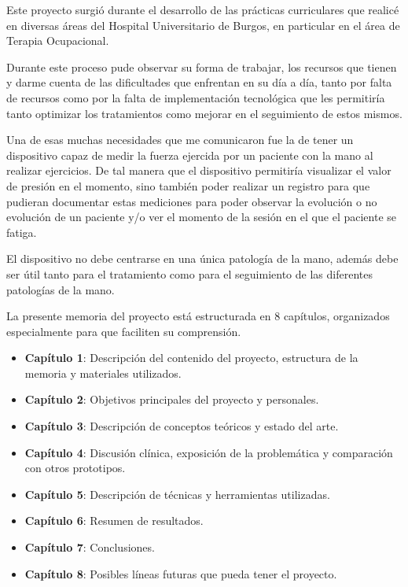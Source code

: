 Este proyecto surgió durante el desarrollo de las prácticas curriculares que realicé en diversas áreas del Hospital Universitario de Burgos, en particular en el área de Terapia Ocupacional. 

Durante este proceso pude observar su forma de trabajar, los recursos que tienen y darme cuenta de las dificultades que enfrentan en su día a día, tanto por falta de recursos como por la falta de implementación tecnológica que les permitiría tanto optimizar los tratamientos como mejorar en el seguimiento de estos mismos.

Una de esas muchas necesidades que me comunicaron fue la de tener un dispositivo capaz de medir la fuerza ejercida por un paciente con la mano al realizar ejercicios. De tal manera que el dispositivo permitiría visualizar el valor de presión en el momento, sino también poder realizar un registro para que pudieran documentar estas mediciones para poder observar la evolución o no evolución de un paciente y/o ver el momento de la sesión en el que el paciente se fatiga.

El dispositivo no debe centrarse en una única patología de la mano, además debe ser útil tanto para el tratamiento como para el seguimiento de las diferentes patologías de la mano.

La presente memoria del proyecto está estructurada en 8 capítulos, organizados especialmente para que faciliten su comprensión.
\begin{itemize}
    \item \textbf{Capítulo 1}: Descripción del contenido del proyecto, estructura de la memoria y materiales utilizados.
    \item \textbf{Capítulo 2}: Objetivos principales del proyecto y personales.
    \item \textbf{Capítulo 3}: Descripción de conceptos teóricos y estado del arte.
    \item \textbf{Capítulo 4}: Discusión clínica, exposición de la problemática y comparación con otros prototipos.
     \item \textbf{Capítulo 5}: Descripción de técnicas y herramientas utilizadas.
    \item \textbf{Capítulo 6}: Resumen de resultados.
    \item \textbf{Capítulo 7}: Conclusiones.
    \item \textbf{Capítulo 8}: Posibles líneas futuras que pueda tener el proyecto.
\end{itemize}